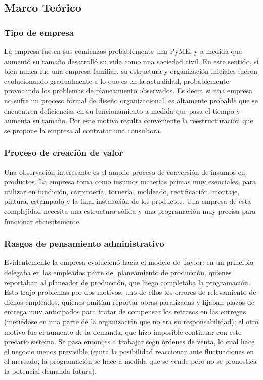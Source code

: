 \documentclass[12pt,a4paper,spanish]{article}
\begin{document}
\subsection{Marco Te\'orico}

\subsubsection{Tipo de empresa}
La empresa fue en sus comienzos probablemente una PyME, y a medida que aument\'o su tama\~no desarroll\'o su vida como una sociedad civil. En este sentido, si bien nunca fue una empresa familiar, su estructura y organizaci\'on iniciales fueron evolucionando gradualmente a lo que es en la actualidad, probablemente provocando los problemas de planeamiento observados. Es decir, si una empresa no sufre un proceso formal de dise\~no organizacional, es altamente probable que se encuentren deficiencias en su funcionamiento a medida que pasa el tiempo y aumenta su tama\~no. Por este motivo resulta conveniente la reestructuraci\'on que se propone la empresa al contratar una consultora.

\subsubsection{Proceso de creaci\'on de valor}
Una observaci\'on interesante es el amplio proceso de conversi\'on de insumos en productos. La empresa toma como insumos materias primas muy esenciales, para utilizar en fundici\'on, carpinter\'ia, torner\'ia, moldeado, rectificaci\'on, montaje, pintura, estampado y la final instalaci\'on de los productos. Una empresa de esta complejidad necesita una estructura s\'olida y una programaci\'on muy precisa para funcionar eficientemente.

\subsubsection{Rasgos de pensamiento administrativo}
Evidentemente la empresa evolucion\'o hacia el modelo de Taylor: en un principio delegaba en los empleados parte del planeamiento de producci\'on, quienes reportaban al planeador de producci\'on, que luego completaba la programaci\'on. Esto trajo problemas por dos motivos; uno de ellos los errores de relevamiento de dichos empleados, quienes omit\'ian reportar obras paralizadas y fijaban plazos de entrega muy anticipados para tratar de compensar los retrasos en las entregas (meti\'edose en una parte de la organizaci\'on que no era su responsabilidad); el otro motivo fue el aumento de la demanda, que hizo imposible continuar con este precario sistema. Se pasa entonces a trabajar segn \'ordenes de venta, lo cual hace el negocio menos previsible (quita la posibilidad reaccionar ante fluctuaciones en el mercado, la programaci\'on se hace a medida que se vende pero no se pronostica la potencial demanda futura).
\end{document}
